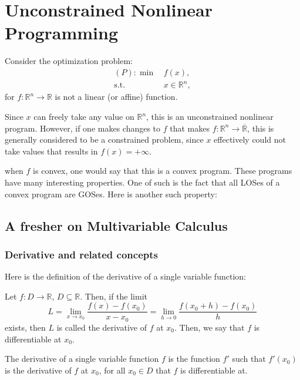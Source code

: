 \chapter{Unconstrained Nonlinear Programming} %
\label{chap:Unconstrained Nonlinear Programming}

Consider the optimization problem:
\begin{align*}
  (P): \min\,&f(x),\\
  \text{s.t.}\,&x \in \mathbb{R}^{n}
,\end{align*} for \( f: \mathbb{R}^{n} \to \mathbb{R} \) is not a linear
(or affine) function.

Since \( x \) can freely take any value on \( \mathbb{R}^{n} \), this is an
unconstrained nonlinear program. However, if one makes changes to \( f \) that
makes \( f: \mathbb{R}^{n} \to \overline{\mathbb{R}}  \), this is generally
considered to be a constrained problem, since \( x \) effectively could not take
values that results in \( f(x) = +\infty \).

when \( f \) is convex, one would say that this is a convex program.
These programs have many interesting properties. One of such is the fact that
all LOSes of a convex program are GOSes. Here is another such property:

\section{A fresher on Multivariable Calculus} %
\label{sec:A fresher on Multivariable Calculus}

\subsection{Derivative and related concepts} %
\label{sub:Derivative and related concepts}

Here is the definition of the derivative of a single variable function:
\begin{definition}
\label{def:Derivative of single variable functions}
  Let \( f: D \to  \mathbb{R} \), \( D \subseteq \mathbb{R} \). Then, if the
  limit
  \[
    L = \lim_{x \to x_{0}} \frac{f(x) - f(x_{0})}{x - x_{0}} = \lim_{h \to 0}
    \frac{f(x_{0} + h) - f(x_{0})}{h}
  \] exists, then \( L \) is called the derivative of \( f \) at \( x_{0} \).
  Then, we say that \( f \) is differentiable at \( x_{0} \).

  The derivative of a single variable function \( f \) is the function \( f' \)
  such that \( f'(x_{0}) \) is the derivative of \( f \) at \( x_{0} \), for all
  \( x_{0} \in D \) that \( f \) is differentiable at.
\end{definition}

